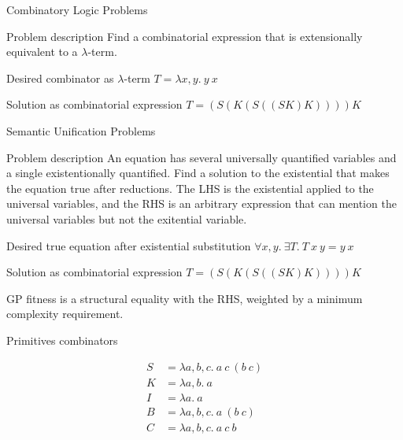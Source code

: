 \documentclass[mathserif]{beamer}
\begin{document}
\begin{frame}{Combinatory Logic Problems}

\begin{block}{Problem description}
Find a combinatorial expression that is extensionally equivalent to a $\lambda$-term.
\end{block}

\begin{block}{Desired combinator as $\lambda$-term}
$T = \lambda x,y . ~ y ~ x$
\end{block}

\begin{block}{Solution as combinatorial expression}
$T = (S(K(S((SK)K))))K$
\end{block}

\end{frame}

\begin{frame}{Semantic Unification Problems}

\begin{block}{Problem description}
An equation has several universally quantified variables and a single
existentionally quantified. Find a solution to the existential that
makes the equation true after reductions. The LHS is the existential
applied to the universal variables, and the RHS is an arbitrary
expression that can mention the universal variables but not the
exitential variable.
\end{block}

\begin{block}{Desired true equation after existential substitution}
$\forall x,y . ~ \exists T . ~ T ~ x ~ y = y ~ x$
\end{block}

\begin{block}{Solution as combinatorial expression}
$T = (S(K(S((SK)K))))K$
\end{block}

GP fitness is a structural equality with the RHS, weighted by a
minimum complexity requirement.

\end{frame}


\begin{frame}{Primitives combinators}

\begin{align*}
S &= \lambda a,b,c . ~ a ~ c ~ (b ~ c)\\
K &= \lambda a,b . ~ a\\
I &= \lambda a . ~ a\\
B &= \lambda a,b,c . ~ a ~ (b ~ c)\\
C &= \lambda a,b,c . ~ a ~ c ~ b
\end{align*}

\end{frame}
\end{document}
